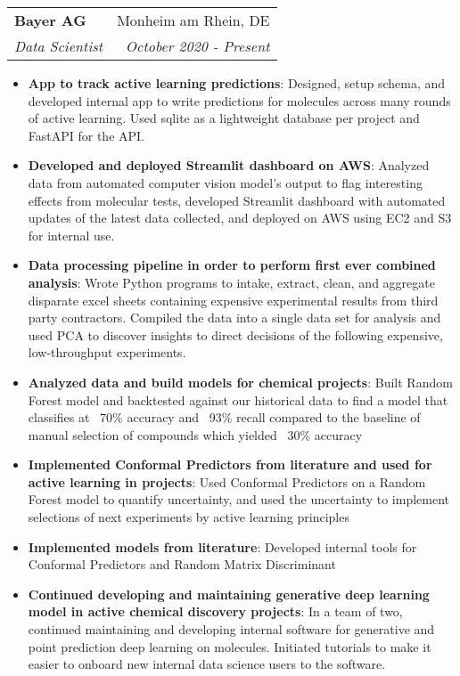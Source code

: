 \documentclass[letterpaper,hidelinks,11pt]{article}
\makeatletter
\newcommand{\resumeItem}[2]{
  \item\small{
    \textbf{#1}{: #2 \vspace{-2pt}}
  }
}
\newcommand{\resumeSubheading}[4]{
  \vspace{-1pt}\item
    \begin{tabular*}{0.97\textwidth}{l@{\extracolsep{\fill}}r}
      \textbf{#1} & #2 \\
      \textit{\small#3} & \textit{\small #4} \\
    \end{tabular*}\vspace{-5pt}
}
\newcommand{\resumeItemListStart}{\begin{itemize}}
\newcommand{\resumeItemListEnd}{\end{itemize}\vspace{-5pt}}
\makeatother
\begin{document}
 \resumeSubheading
 {Bayer AG}{Monheim am Rhein, DE}
 {Data Scientist}{October 2020 - Present}
   \resumeItemListStart
    \resumeItem{App to track active learning predictions}{Designed, setup schema, and developed internal app to write predictions for molecules across many rounds of active learning. Used sqlite as a lightweight database per project and FastAPI for the API.}
    \resumeItem{Developed and deployed Streamlit dashboard on AWS}{Analyzed data from automated computer vision model's output to flag interesting effects from molecular tests, developed Streamlit dashboard with automated updates of the latest data collected, and deployed on AWS using EC2 and S3 for internal use.}
   	\resumeItem{Data processing pipeline in order to perform first ever combined analysis}
  		{Wrote Python programs to intake, extract, clean, and aggregate disparate excel sheets containing expensive experimental results from third party contractors. Compiled the data into a single data set for analysis and used PCA to discover insights to direct decisions of the following expensive, low-throughput experiments.}
   	\resumeItem{Analyzed data and build models for chemical projects}
  		{Built Random Forest model and backtested against our historical data to find a model that classifies at ~70\% accuracy and ~93\% recall compared to the baseline of manual selection of compounds which yielded ~30\% accuracy}
	\resumeItem{Implemented Conformal Predictors from literature and used for active learning in projects}
  		{Used Conformal Predictors on a Random Forest model to quantify uncertainty, and used the uncertainty to implement selections of next experiments by active learning principles}
	\resumeItem{Implemented models from literature}{Developed internal tools for Conformal Predictors and Random Matrix Discriminant}
	\resumeItem{Continued developing and maintaining generative deep learning model in active chemical discovery projects}{In a team of two, continued maintaining and developing internal software for generative and point prediction deep learning on molecules. Initiated tutorials to make it easier to onboard new internal data science users to the software.}
  \resumeItemListEnd
\end{document}
